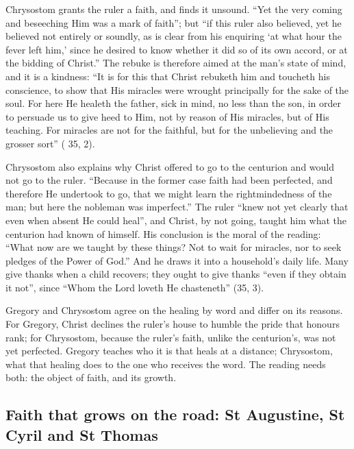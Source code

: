 Chrysostom grants the ruler a faith, and finds it unsound. ``Yet the
very coming and beseeching Him was a mark of faith''; but ``if this ruler also
believed, yet he believed not entirely or soundly, as is clear from his
enquiring `at what hour the fever left him,' since he desired to know whether it
did so of its own accord, or at the bidding of Christ.'' The rebuke is therefore
aimed at the man's state of mind, and it is a kindness: ``It is for this that
Christ rebuketh him and toucheth his conscience, to show that His miracles were
wrought principally for the sake of the soul. For here He healeth the father,
sick in mind, no less than the son, in order to persuade us to give heed to Him,
not by reason of His miracles, but of His teaching. For miracles are not for the
faithful, but for the unbelieving and the grosser sort'' ( 35, 2).

Chrysostom also explains why Christ offered to go to the centurion and would not
go to the ruler. ``Because in the former case faith had been perfected, and
therefore He undertook to go, that we might learn the rightmindedness of the
man; but here the nobleman was imperfect.'' The ruler ``knew not yet clearly
that even when absent He could heal'', and Christ, by not going, taught him
what the centurion had known of himself. His conclusion is the moral of the
reading: ``What now are we taught by these things? Not to wait for miracles,
nor to seek pledges of the Power of God.'' And he draws it into a household's
daily life. Many give thanks when a child recovers; they ought to give thanks
``even if they obtain it not'', since ``Whom the Lord loveth He chasteneth''
(35, 3).

Gregory and Chrysostom agree on the healing by word and differ on its reasons.
For Gregory, Christ declines the ruler's house to humble the pride that
honours rank; for Chrysostom, because the ruler's faith, unlike the
centurion's, was not yet perfected. Gregory teaches who it is that heals at a
distance; Chrysostom, what that healing does to the one who receives the word.
The reading needs both: the object of faith, and its growth.

\subsection{Faith that grows on the road: St Augustine, St Cyril and St Thomas}

